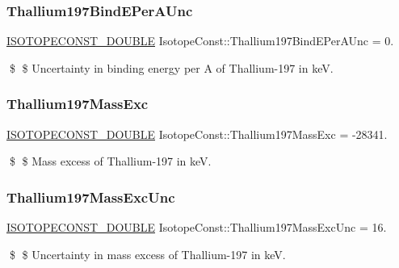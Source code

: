 \subsubsection{\texorpdfstring{Thallium197\+Bind\+E\+Per\+A\+Unc}{Thallium197BindEPerAUnc}}
{\footnotesize\ttfamily \mbox{\hyperlink{group___isotope_const-_macros_ga8f45a7272ce02c0b4c65c44636ed719a}{I\+S\+O\+T\+O\+P\+E\+C\+O\+N\+S\+T\+\_\+\+D\+O\+U\+B\+LE}} Isotope\+Const\+::\+Thallium197\+Bind\+E\+Per\+A\+Unc = 0.}

\$ \$ Uncertainty in binding energy per A of Thallium-\/197 in keV. \mbox{\label{group___isotope_const-_thallium-_tl197_ga4ce213221b7a7850da5516ad109455b4}} 
\subsubsection{\texorpdfstring{Thallium197\+Mass\+Exc}{Thallium197MassExc}}
{\footnotesize\ttfamily \mbox{\hyperlink{group___isotope_const-_macros_ga8f45a7272ce02c0b4c65c44636ed719a}{I\+S\+O\+T\+O\+P\+E\+C\+O\+N\+S\+T\+\_\+\+D\+O\+U\+B\+LE}} Isotope\+Const\+::\+Thallium197\+Mass\+Exc = -\/28341.}

\$ \$ Mass excess of Thallium-\/197 in keV. \mbox{\label{group___isotope_const-_thallium-_tl197_gae0f626bf8d59512c9069a0d0c94f8102}} 
\subsubsection{\texorpdfstring{Thallium197\+Mass\+Exc\+Unc}{Thallium197MassExcUnc}}
{\footnotesize\ttfamily \mbox{\hyperlink{group___isotope_const-_macros_ga8f45a7272ce02c0b4c65c44636ed719a}{I\+S\+O\+T\+O\+P\+E\+C\+O\+N\+S\+T\+\_\+\+D\+O\+U\+B\+LE}} Isotope\+Const\+::\+Thallium197\+Mass\+Exc\+Unc = 16.}

\$ \$ Uncertainty in mass excess of Thallium-\/197 in keV. \mbox{\label{group___isotope_const-_thallium-_tl197_ga1d223f5d027e66e6d9dc82ab54781329}} 
